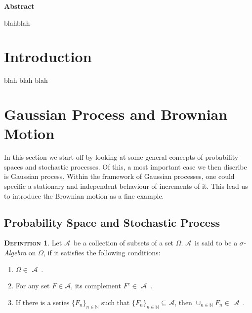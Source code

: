 \documentclass[a4paper, twoside, 11pt]{article}
\theoremstyle{definition}
\newtheorem{definition}{\scshape Definition}[section]
\def\AA{$\mathscr{A}$\ }
\newcommand{\compl}[1]{{#1}^{c}}
\renewenvironment{abstract}{
	\begin{center}
		  \Large
		  \textbf{Abstract}
		  \hspace{2em}
	\end{center}				
  }{}
\begin{document}
  
  \newpage

  \thispagestyle{empty}
  \begin{abstract}
	blahblah
  \end{abstract}
\newpage

\thispagestyle{empty}
\mbox{}
\newpage
\fancyhead[LO, RE]{}
\fancyfoot[LE, RO]{}
\tableofcontents
\newpage
\thispagestyle{empty}
\mbox{}
\newpage

\fancyhead[RO]{\leftmark}
\fancyhead[LE]{\rightmark}
\fancyfoot[LE, RO]{\large \thepage}
\setcounter{section}{0}
\setcounter{page}{1}
\section{Introduction}
blah
\newpage
blah
\newpage
blah

\newpage

\section{Gaussian Process and Brownian Motion}
In this section we start off by looking at some general concepts of probability spaces and stochastic processes. Of this, a most important case we then discribe is Gaussian process. Within the framework of Gaussian processes, one could specific a stationary and independent behaviour of increments of it. This lead us to introduce the Brownian motion as a fine example.

\subsection{Probability Space and Stochastic Process }
\begin{definition}
  Let \AA be a collection of subsets of a set $\Omega$. \AA is said to be a \emph{$\sigma$- Algebra} on $\Omega$, if it satisfies the following conditions:
  \begin{enumerate}[topsep=0pt, itemsep=-1ex, partopsep=1ex, parsep=1ex, label=(\roman*)]
	\item $\Omega \in $ \AA.
	\item For any set $F \in \mathscr{A}$, its complement $\compl{F} \in$ \AA.
	\item If there is a series $\{F_n\}_{n\in \mathbb{N}}$ such that $\{F_n\}_{n \in \mathbb{N}} \subseteq \mathscr{A}$, then $\cup_{n \in \mathbb{N}}F_n \in $ \AA.
  \end{enumerate}
\end{definition}
\end{document}
